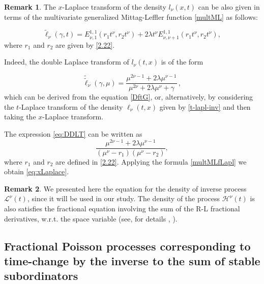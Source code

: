 \documentclass[12pt]{article}
\theoremstyle{definition}
\newtheorem{remark}{Remark}
\theoremstyle{plain}
\begin{document}
	\begin{remark}
		The $x$-Laplace transform of the density $l_\nu(x,t)$ can be also given in terms of the multivariate generalized Mittag-Leffler function \eqref{multML} as follows:
		
		\begin{equation}\label{eq:xLaplace}
			\tilde{\ell}_{\nu}(\gamma, t) = E^{1,1}_{\nu, 1} (r_1 t^{\nu}, r_2 t^{\nu}) + 2\lambda t^{\nu} E^{1,1}_{\nu, \nu + 1}(r_1 t^{\nu}, r_2 t^{\nu}),
		\end{equation}
		where $r_1$ and $r_2$ are given by \eqref{2.22}.
		
		Indeed, the double Laplace transform of $l_{\nu}(t,x)$ is of the form
		
		\begin{equation}\label{eq:DDLT}
			\tilde{\tilde{\ell}}_{\nu}(\gamma, \mu) = \frac{\mu^{2\nu - 1} + 2\lambda \mu^{\nu - 1}}{\mu^{2\nu} + 2\lambda \mu^{\nu} + \gamma}\, ,
		\end{equation}
		which can be derived from the equation \eqref{DftG}, or, alternatively, by considering the $t$-Laplace transform of the density $\ell_{\nu}(t,x)$ given by   
		\eqref{t-lapl-inv} and then taking the $x$-Laplace transform.
		
		The expression \eqref{eq:DDLT} can be written as
		\begin{equation*}
			\frac{\mu^{2\nu - 1} + 2\lambda \mu^{\nu - 1}}{(\mu^{\nu} - r_1)(\mu^{\nu} - r_2)},
		\end{equation*}
		where $r_1$ and $r_2$ are defined in \eqref{2.22}. Applying the formula 
		\eqref{multMLfLapl} we obtain \eqref{eq:xLaplace}.
	\end{remark}

\begin{remark}
We presented here the equation for the density of  inverse process $\mathcal{L}^\nu(t)$, since it will be used in our study. The density of the process $\mathcal{H}^\nu(t)$ is also satisfies the fractional equation involving the sum of the R-L fractional derivatives,  w.r.t. the space variable (see, for details \cite{OT2017}, \cite{T}).  
\end{remark}


\subsection{Fractional Poisson processes  corresponding to time-change by the inverse to the sum of stable subordinators}
\end{document}
